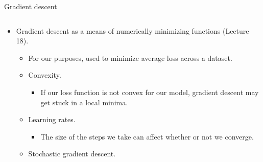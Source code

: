 \documentclass[aspectratio=169]{../latex_main/tntbeamer}  %
\begin{document}
	\begin{frame}{Gradient descent}
	          \begin{columns}
	            \begin{column}{.6\textwidth}
	            \begin{itemize}
	                \item Gradient descent as a means of numerically minimizing functions (Lecture 18).
	                \begin{itemize}
	                    \item For our purposes, used to minimize average loss across a dataset.
	                    \item Convexity.
	                    \begin{itemize}
	                        \item If our loss function is not convex for our model, gradient descent may get stuck in a local minima.
	                    \end{itemize}
	                    \item Learning rates.
	                    \begin{itemize}
	                        \item The size of the steps we take can affect whether or not we converge.
	                    \end{itemize}
	                    \item Stochastic gradient descent.
	                \end{itemize}
	            \end{itemize}
	            \end{column}
	            

\end{columns}
\end{frame}
\end{document}
